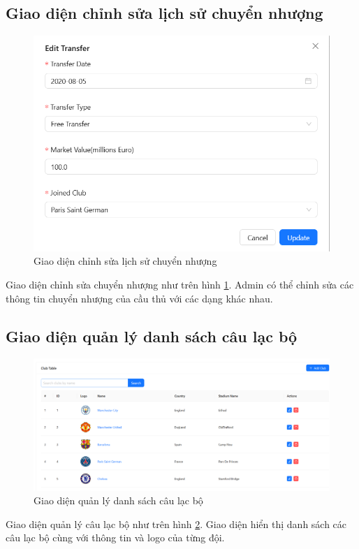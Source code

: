 \documentclass[../BTL.tex]{subfiles}
\begin{document}
\subsection{Giao diện chỉnh sửa lịch sử chuyển nhượng}
\begin{figure}
    \centering
    \includegraphics[width=1\linewidth]{Hinhve/admin_edit_transfer.png}
    \caption{Giao diện chỉnh sửa lịch sử chuyển nhượng}
    \label{fig:admin_edit_transfer}
\end{figure}
Giao diện chỉnh sửa chuyển nhượng như trên hình \ref{fig:admin_edit_transfer}. Admin có thể chỉnh sửa các thông tin chuyển nhượng của cầu thủ với các dạng khác nhau.

\subsection{Giao diện quản lý danh sách câu lạc bộ}
\begin{figure}
    \centering
    \includegraphics[width=1\linewidth]{Hinhve/admin_clubs.png}
    \caption{Giao diện quản lý danh sách câu lạc bộ}
    \label{fig:admin_clubs}
\end{figure}
Giao diện quản lý câu lạc bộ như trên hình \ref{fig:admin_clubs}. Giao diện hiển thị danh sách các câu lạc bộ cùng với thông tin và logo của từng đội.
\end{document}
